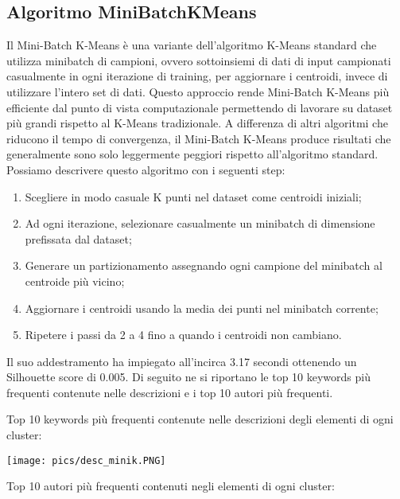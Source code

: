 \documentclass[12pt,oneside]{article}
\begin{document}
    \begin{enumerate}
    \subsection{Algoritmo MiniBatchKMeans}
    \begin{justify}
    Il Mini-Batch K-Means è una variante dell'algoritmo K-Means standard che utilizza minibatch di campioni, ovvero sottoinsiemi di dati di input campionati casualmente in ogni iterazione di training, per aggiornare i centroidi, invece di utilizzare l'intero set di dati. Questo approccio rende Mini-Batch K-Means più efficiente dal punto di vista computazionale permettendo di lavorare su dataset più grandi rispetto al K-Means tradizionale. A differenza di altri algoritmi che riducono il tempo di convergenza, il Mini-Batch K-Means produce risultati che generalmente sono solo leggermente peggiori rispetto all’algoritmo standard. 
    Possiamo descrivere questo algoritmo con i seguenti step:

    \begin{enumerate}[label=\arabic*)]
        \item Scegliere in modo casuale K punti nel dataset come centroidi iniziali;
        \item Ad ogni iterazione, selezionare casualmente un minibatch di dimensione prefissata dal dataset;
        \item Generare un partizionamento assegnando ogni campione del minibatch al centroide più vicino; 
        \item Aggiornare i centroidi usando la media dei punti nel minibatch corrente;
        \item Ripetere i passi da 2 a 4 fino a quando i centroidi non cambiano.
    \end{enumerate}
    Il suo addestramento ha impiegato all’incirca 3.17 secondi ottenendo un Silhouette score di 0.005. Di seguito ne si riportano le top 10 keywords più frequenti contenute nelle descrizioni e i top 10 autori più frequenti.
    \end{justify}
    \hfill
    \begin{justify}
    Top 10 keywords più frequenti contenute nelle descrizioni degli elementi di ogni cluster:
    \end{justify}

    \texttt{[image: pics/desc\_minik.PNG]}
    
    \begin{justify}
    Top 10 autori più frequenti contenuti negli elementi di ogni cluster:
    \end{justify}


\end{enumerate}
\end{document}
